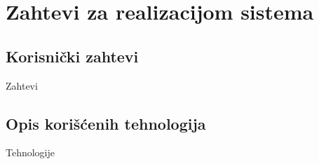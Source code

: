 \chapter{Zahtevi za realizacijom sistema}
\section{Korisnički zahtevi}
Zahtevi
\section{Opis korišćenih tehnologija}
Tehnologije